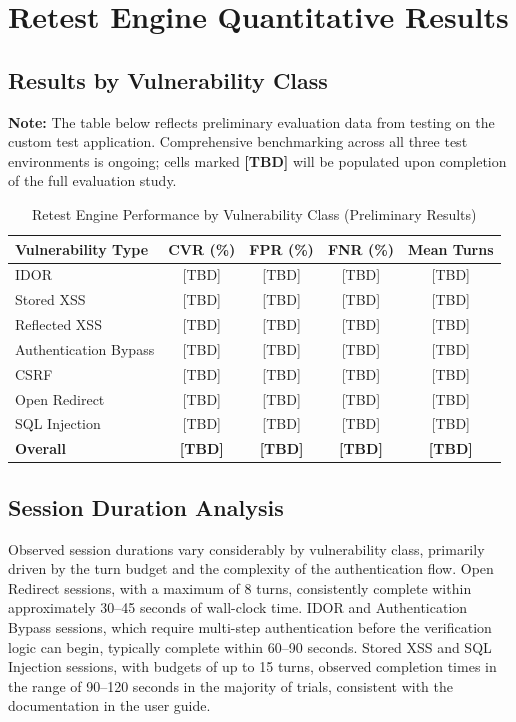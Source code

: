 \section{Retest Engine Quantitative Results}

\subsection{Results by Vulnerability Class}

\noindent\textbf{Note:} The table below reflects preliminary evaluation data from testing on the custom test application. Comprehensive benchmarking across all three test environments is ongoing; cells marked \textbf{[TBD]} will be populated upon completion of the full evaluation study.

\begin{table}[h!]
\centering
\caption{Retest Engine Performance by Vulnerability Class (Preliminary Results)}
\label{tab:results}
\begin{tabular}{|l|c|c|c|c|}
\hline
\textbf{Vulnerability Type} & \textbf{CVR (\%)} & \textbf{FPR (\%)} & \textbf{FNR (\%)} & \textbf{Mean Turns} \\
\hline
IDOR & [TBD] & [TBD] & [TBD] & [TBD] \\
Stored XSS & [TBD] & [TBD] & [TBD] & [TBD] \\
Reflected XSS & [TBD] & [TBD] & [TBD] & [TBD] \\
Authentication Bypass & [TBD] & [TBD] & [TBD] & [TBD] \\
CSRF & [TBD] & [TBD] & [TBD] & [TBD] \\
Open Redirect & [TBD] & [TBD] & [TBD] & [TBD] \\
SQL Injection & [TBD] & [TBD] & [TBD] & [TBD] \\
\hline
\textbf{Overall} & \textbf{[TBD]} & \textbf{[TBD]} & \textbf{[TBD]} & \textbf{[TBD]} \\
\hline
\end{tabular}
\end{table}

\subsection{Session Duration Analysis}

Observed session durations vary considerably by vulnerability class, primarily driven by the turn budget and the complexity of the authentication flow. Open Redirect sessions, with a maximum of 8 turns, consistently complete within approximately 30--45 seconds of wall-clock time. IDOR and Authentication Bypass sessions, which require multi-step authentication before the verification logic can begin, typically complete within 60--90 seconds. Stored XSS and SQL Injection sessions, with budgets of up to 15 turns, observed completion times in the range of 90--120 seconds in the majority of trials, consistent with the documentation in the user guide.


